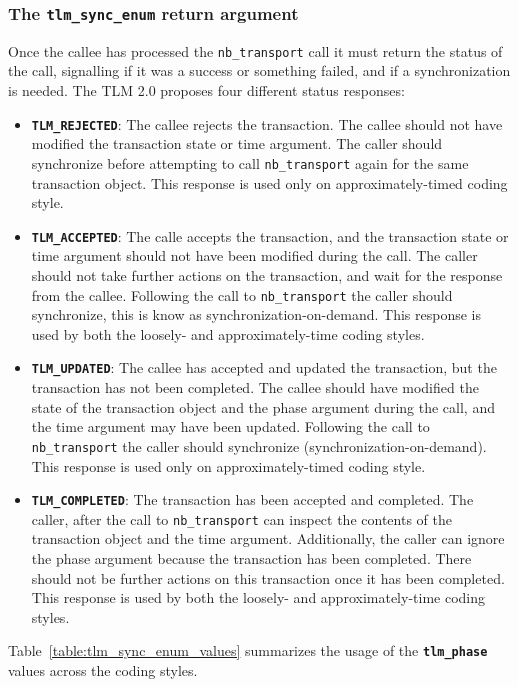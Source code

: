 {\subsubsection{The \texttt{tlm\_sync\_enum} return argument}
Once the callee has processed the \texttt{nb\_transport} call it must return the status of the call, signalling if it was a success or something failed, and if a synchronization is needed.
The TLM 2.0 proposes four different status responses:
\begin{itemize}
	\item \texttt{\textbf{TLM\_REJECTED}}: The callee rejects the transaction. 
	The callee should not have modified the transaction state or time argument.
	The caller should synchronize before attempting to call \texttt{nb\_transport} again for the same transaction object.
	This response is used only on approximately-timed coding style.
	\item \texttt{\textbf{TLM\_ACCEPTED}}: The calle accepts the transaction, and the transaction state or time argument should not have been modified during the call.
	The caller should not take further actions on the transaction, and wait for the response from the callee.
	Following the call to \texttt{nb\_transport} the caller should synchronize, this is know as synchronization-on-demand.
	This response is used by both the loosely- and approximately-time coding styles.
	\item \texttt{\textbf{TLM\_UPDATED}}: The callee has accepted and updated the transaction, but the transaction has not been completed.
	The callee should have modified the state of the transaction object and the phase argument during the call, and the time argument may have been updated.
	Following the call to \texttt{nb\_transport} the caller should synchronize (synchronization-on-demand).
	This response is used only on approximately-timed coding style.
	\item \texttt{\textbf{TLM\_COMPLETED}}: The transaction has been accepted and completed.
	The caller, after the call to \texttt{nb\_transport} can inspect the contents of the transaction object and the time argument.
	Additionally, the caller can ignore the phase argument because the transaction has been completed.
	There should not be further actions on this transaction once it has been completed.
	This response is used by both the loosely- and approximately-time coding styles.
\end{itemize}
Table~\ref{table:tlm_sync_enum_values} summarizes the usage of the \texttt{\textbf{tlm\_phase}} values across the coding styles.

}

